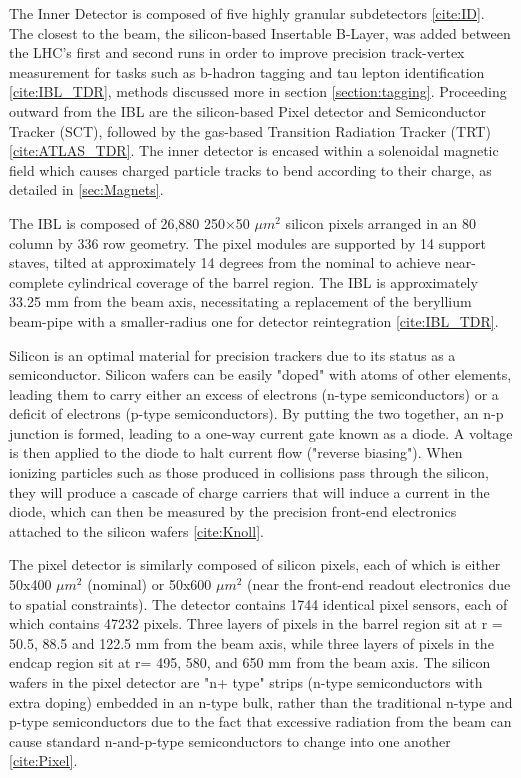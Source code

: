 The Inner Detector is composed of five highly granular subdetectors \ref{cite:ID}. The closest to the beam, the silicon-based Insertable B-Layer, was added between the LHC's first and second runs in order to improve precision track-vertex measurement for tasks such as b-hadron tagging and tau lepton identification \ref{cite:IBL_TDR}, methods discussed more in section \ref{section:tagging}. Proceeding outward from the IBL are the silicon-based Pixel detector and Semiconductor Tracker (SCT), followed by the gas-based Transition Radiation Tracker (TRT) \ref{cite:ATLAS_TDR}. The inner detector is encased within a solenoidal magnetic field which causes charged particle tracks to bend according to their charge, as detailed in \ref{sec:Magnets}.

The IBL is composed of 26,880 250×50 $ \mu m^2 $ silicon pixels arranged in an 80 column by 336 row geometry. The pixel modules are supported by 14 support staves, tilted at approximately 14 degrees from the nominal to achieve near-complete cylindrical coverage of the barrel region. The IBL is approximately 33.25 mm from the beam axis, necessitating a replacement of the beryllium beam-pipe with a smaller-radius one for detector reintegration \ref{cite:IBL_TDR}.

Silicon is an optimal material for precision trackers due to its status as a semiconductor. Silicon wafers can be easily "doped" with atoms of other elements, leading them to carry either an excess of electrons (n-type semiconductors) or a deficit of electrons (p-type semiconductors). By putting the two together, an n-p junction is formed, leading to a one-way current gate known as a diode. A voltage is then applied to the diode to halt current flow ("reverse biasing"). When ionizing particles such as those produced in collisions pass through the silicon, they will produce a cascade of charge carriers that will induce a current in the diode, which can then be measured by the precision front-end electronics attached to the silicon wafers \ref{cite:Knoll}.

The pixel detector is similarly composed of silicon pixels, each of which is either 50x400 $ \mu m^2 $ (nominal) or 50x600 $ \mu m^2 $ (near the front-end readout electronics due to spatial constraints). The detector contains 1744 identical pixel sensors, each of which contains 47232 pixels. Three layers of pixels in the barrel region sit at r = 50.5,  88.5 and 122.5 mm from the beam axis, while three layers of pixels in the endcap region sit at r= 495, 580, and 650 mm from the beam axis. The silicon wafers in the pixel detector are "n+ type" strips (n-type semiconductors with extra doping) embedded in an n-type bulk, rather than the traditional n-type and p-type semiconductors due to the fact that excessive radiation from the beam can cause standard n-and-p-type semiconductors to change into one another \ref{cite:Pixel}. 

